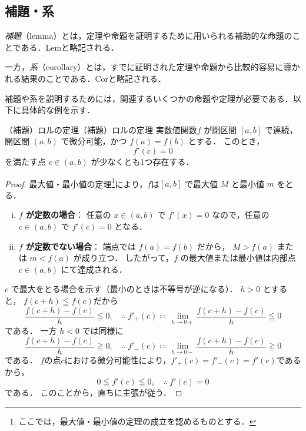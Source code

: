 \subsection{補題・系}

\emph{補題}（lemma）とは，定理や命題を証明するために用いられる補助的な命題のことである．Lemと略記される．

一方，\emph{系}（corollary）とは，すでに証明された定理や命題から比較的容易に導かれる結果のことである．Corと略記される．

補題や系を説明するためには，関連するいくつかの命題や定理が必要である．以下に具体的な例を示す．


\begin{example}{（補題）ロルの定理}{（補題）ロルの定理}
  実数値関数$f$ が閉区間 $[a,b]$ で連続，開区間 $(a,b)$ で微分可能，かつ $f(a)=f(b)$ とする．
  このとき，
  \[
  f'(c)=0
  \]
  を満たす点 $c \in (a,b)$ が少なくとも1つ存在する．
\end{example}

\begin{tleftbar}
\begin{proof}
最大値・最小値の定理\footnote{ここでは，最大値・最小値の定理の成立を認めるものとする．}により，$f$は$[a,b]$ で最大値 $M$ と最小値 $m$ をとる．

\begin{enumerate}[(i)]
  \item \textbf{$f$ が定数の場合}：
  任意の $x \in (a,b)$ で $f'(x)=0$ なので，任意の $c \in(a,b)$ で
  $f'(c)=0$ となる．

  \item \textbf{$f$ が定数でない場合}：
  端点では $f(a)=f(b)$ だから，
  $M>f(a)$ または $m<f(a)$ が成り立つ．
  したがって，$f$ の最大値または最小値は内部点
  $c \in(a,b)$ にて達成される．
\end{enumerate}

$c$ で最大をとる場合を示す（最小のときは不等号が逆になる）．
$h>0$ とすると， $f(c+h) \leqq f(c)$だから
\[
\frac{f(c+h)-f(c)}{h} \leqq 0 ,\quad \therefore ~ f'_+(c) \coloneqq \lim_{h \to 0+} \frac{f(c+h)-f(c)}{h}\leqq 0
\]
である．
一方 $h<0$ では同様に
\[
\frac{f(c+h)-f(c)}{h}\geqq 0 , \quad \therefore~  f'_-(c)\coloneqq \lim_{h\to0-}\frac{f(c+h)-f(c)}{h}\geqq 0
\]
である．
$f$の点$c$における微分可能性により，$f'_+(c)=f'_-(c)=f'(c)$であるから，
\[
0\leqq f'(c)\leqq 0 , \quad \therefore ~f'(c)=0
\]
である．
このことから，直ちに主張が従う．
\end{proof}
\end{tleftbar}


